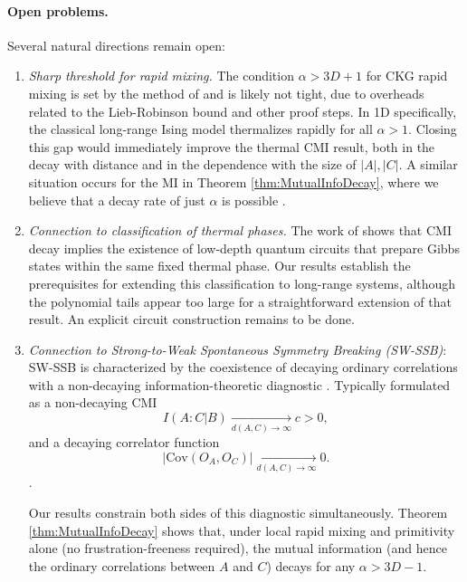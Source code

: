 \documentclass[11pt]{article}
\numberwithin{equation}{section}
\numberwithin{figure}{section}
\numberwithin{table}{section}
\theoremstyle{definition}
\theoremstyle{plain}
\theoremstyle{remark}
\begin{document}
\paragraph{Open problems.}
Several natural directions remain open:
\begin{enumerate}
\item \emph{Sharp threshold for rapid mixing.}
The condition $\alpha>3D+1$ for CKG rapid mixing is set by the method of
\cite{rouze_efficient_2025} and is likely not tight, due to overheads related to the Lieb-Robinson bound and other proof steps. In 1D specifically, the classical long-range Ising
model thermalizes rapidly for all $\alpha>1$. Closing this gap
would immediately improve the thermal CMI result, both in the decay with distance and in the dependence with the size of $\vert A \vert, \vert C \vert$. A similar situation occurs for the MI in Theorem \ref{thm:MutualInfoDecay}, where we believe that a decay rate of just $\alpha$ is possible \cite{kim_thermal_2025}.

\item \emph{Connection to classification of thermal phases.}
The work of \cite{MKS25} shows that CMI decay implies the existence of
low-depth quantum circuits that prepare Gibbs states within the same fixed thermal phase.
Our results establish the prerequisites for extending this classification to
long-range systems, although the polynomial tails appear too large for a straightforward extension of that result. An explicit circuit construction remains to be done.


\item \emph{Connection to Strong-to-Weak Spontaneous Symmetry Breaking (SW-SSB)}: SW-SSB is characterized by the coexistence of decaying ordinary correlations with a non-decaying information-theoretic diagnostic \cite{Lessa_2025}. Typically formulated as a non-decaying CMI \[I(A:C|B)\xrightarrow[d(A,C) \to \infty]{} c >0, \]and a decaying correlator function\[|\text{Cov}(O_A,O_C)|\xrightarrow[d(A,C)\to\infty]{} 0.\]. 

Our results constrain both sides of this diagnostic simultaneously. Theorem \ref{thm:MutualInfoDecay} shows that, under local rapid mixing and primitivity alone (no frustration-freeness required), the mutual information (and hence the ordinary correlations between $A$ and $C$) decays for any $\alpha>3D-1$. 


\end{enumerate}
\end{document}
